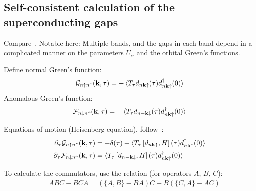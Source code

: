 \subsection{Self-consistent calculation of the superconducting gaps}

Compare~\cite[ch. 10]{Bruus_Flensberg_2004}.
Notable here: Multiple bands, and the gaps in each band depend in a complicated manner on the parameters \(U_{\alpha}\) and the orbital Green's functions.

Define normal Green's function:
\begin{equation}
    \mathcal{G}_{n\uparrow n\uparrow} (\bm{\mathrm{k}}, \tau) = -\braket{T_{\tau} d_{n \bm{\mathrm{k}} \uparrow} (\tau) d_{n \bm{\mathrm{k}} \uparrow}^{\dagger} (0)}
\end{equation}
Anomalous Green's function:
\begin{equation}
    \mathcal{F}_{n\downarrow n\uparrow} (\bm{\mathrm{k}}, \tau) = -\braket{T_{\tau} d_{n -\bm{\mathrm{k}} \downarrow} (\tau) d_{n \bm{\mathrm{k}} \uparrow}^{\dagger} (0)}
\end{equation}

Equations of motion (Heisenberg equation), follow~\cite[ch. 17]{Bruus_Flensberg_2004}:
\begin{align}
    \pdif{\tau} \mathcal{G}_{n\uparrow n\uparrow} (\vb{k}, \tau) &= -\delta (\tau) + \braket{T_{\tau} \left[d_{n \vb{k} \uparrow}, H\right] (\tau) d_{n \vb{k} \uparrow}^{\dagger} (0)} \\
    \pdif{\tau} \mathcal{F}_{n\downarrow n\uparrow} (\vb{k}, \tau) &= \braket{T_{\tau} \left[d_{n -\vb{k} \downarrow}, H\right] (\tau) d_{n \vb{k} \uparrow}^{\dagger} (0)}
\end{align}

To calculate the commutators, use the relation (for operators \(A\), \(B\), \(C\)):
\begin{align}
    [A, BC] = ABC - BCA = (\{A, B\} - BA) C - B(\{C, A\} - AC)
\end{align}

